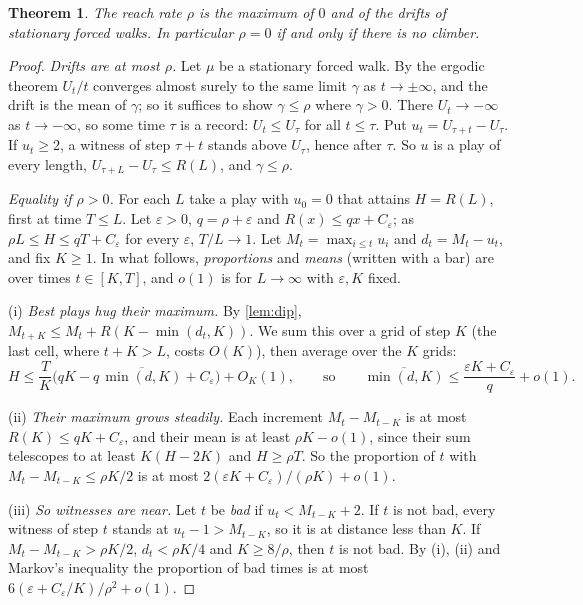 \documentclass[11pt]{amsart}
\newtheorem{theorem}{Theorem}[section]
\theoremstyle{definition}
\newcommand{\eps}{\varepsilon}
\begin{document}
\begin{theorem}\label{thm:climber}
The reach rate $\rho$ is the maximum of $0$ and of the drifts of stationary forced walks. In particular $\rho=0$ if and only if there
is no climber.
\end{theorem}

\begin{proof}
\emph{Drifts are at most $\rho$.} Let $\mu$ be a stationary forced walk. By the ergodic theorem $U_t/t$ converges almost
surely to the same limit $\gamma$ as $t\to\pm\infty$, and the drift is the mean of $\gamma$; so it suffices to show
$\gamma\le\rho$ where $\gamma>0$. There $U_t\to-\infty$ as $t\to-\infty$, so some time $\tau$ is a record: $U_t\le U_\tau$ for all $t\le\tau$. Put
$u_t=U_{\tau+t}-U_\tau$. If $u_t\ge2$, a witness of step $\tau+t$ stands above $U_\tau$, hence after $\tau$. So $u$ is a
play of every length, $U_{\tau+L}-U_\tau\le R(L)$, and $\gamma\le\rho$.

\emph{Equality if $\rho>0$.} For each $L$ take a play with $u_0=0$ that attains $H=R(L)$, first at time $T\le L$. Let
$\eps>0$, $q=\rho+\eps$ and $R(x)\le qx+C_\eps$; as $\rho L\le H\le qT+C_\eps$ for every $\eps$, $T/L\to1$. Let $M_t=\max_{i\le t}u_i$ and
$d_t=M_t-u_t$, and fix $K\ge1$. In what follows, \emph{proportions} and \emph{means} (written with a bar) are over times $t\in[K,T]$, and $o(1)$ is
for $L\to\infty$ with $\eps,K$ fixed.

(i) \emph{Best plays hug their maximum.} By \cref{lem:dip}, $M_{t+K}\le M_t+R(K-\min(d_t,K))$. We sum this over a grid of step $K$ (the last cell, where $t+K>L$, costs $O(K)$), then average over the $K$ grids:
\[
 H\le\frac TK\Big(qK-q\,\overline{\min(d,K)}+C_\eps\Big)+O_K(1),\qquad\text{so}\qquad \overline{\min(d,K)}\le\frac{\eps K+C_\eps}q+o(1).
\]

(ii) \emph{Their maximum grows steadily.} Each increment $M_{t}-M_{t-K}$ is at most $R(K)\le qK+C_\eps$, and their mean is at least $\rho K-o(1)$, since their sum telescopes to at least
$K(H-2K)$ and $H\ge\rho T$. So the
proportion of $t$ with $M_t-M_{t-K}\le\rho K/2$ is at most $2(\eps K+C_\eps)/(\rho K)+o(1)$.

(iii) \emph{So witnesses are near.} Let $t$ be \emph{bad} if $u_t<M_{t-K}+2$. If $t$ is not bad, every witness of step $t$ stands at $u_t-1>M_{t-K}$, so it is
at distance less than $K$. If $M_t-M_{t-K}>\rho K/2$, $d_t<\rho K/4$ and $K\ge8/\rho$, then $t$ is not bad. By (i), (ii)
and Markov's inequality the proportion of bad times is at most $6(\eps+C_\eps/K)/\rho^2+o(1)$.


\end{proof}
\end{document}
